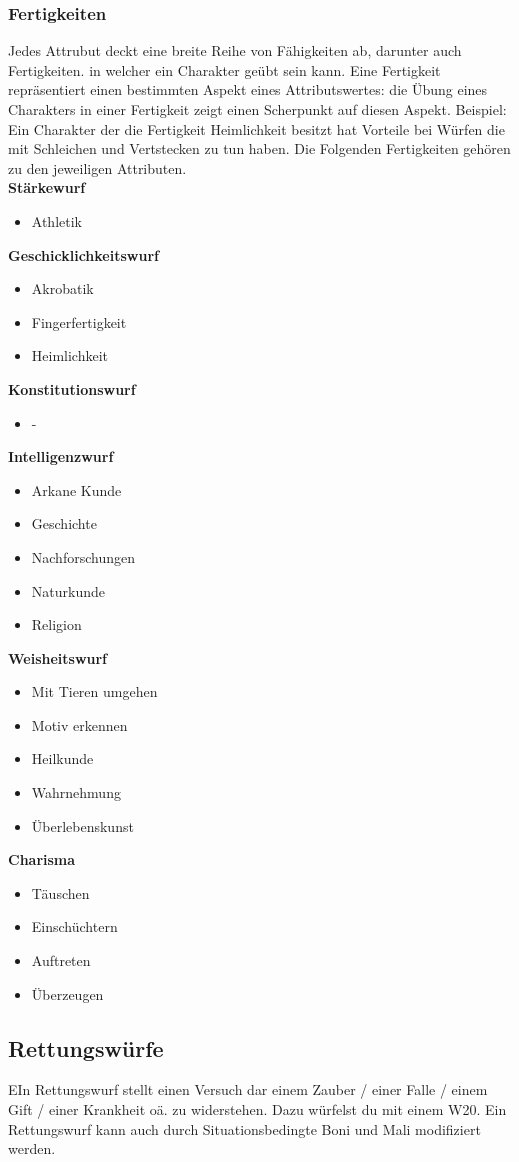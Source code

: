 \subsubsection{Fertigkeiten}
Jedes Attrubut deckt eine breite Reihe von Fähigkeiten ab, darunter auch Fertigkeiten. in welcher ein Charakter geübt sein kann. Eine Fertigkeit repräsentiert einen bestimmten Aspekt eines Attributswertes: die Übung eines Charakters in einer Fertigkeit zeigt einen Scherpunkt auf diesen Aspekt.
Beispiel: Ein Charakter der die Fertigkeit Heimlichkeit besitzt hat Vorteile bei Würfen die mit Schleichen und Vertstecken zu tun haben. Die Folgenden Fertigkeiten gehören zu den jeweiligen Attributen.\\

\noindent \textbf{Stärkewurf}\\
\begin{itemize}
  \item Athletik
\end{itemize}
\noindent \textbf{Geschicklichkeitswurf}\\
\begin{itemize}
  \item Akrobatik
  \item Fingerfertigkeit
  \item Heimlichkeit
\end{itemize}
\noindent \textbf{Konstitutionswurf}\\
\begin{itemize}
  \item -
\end{itemize}
\noindent \textbf{Intelligenzwurf}\\
\begin{itemize}
  \item Arkane Kunde
  \item Geschichte
  \item Nachforschungen
  \item Naturkunde
  \item Religion
\end{itemize}
\noindent \textbf{Weisheitswurf}\\
\begin{itemize}
  \item Mit Tieren umgehen
  \item Motiv erkennen
  \item Heilkunde
  \item Wahrnehmung
  \item Überlebenskunst
\end{itemize}
\noindent \textbf{Charisma}\\
\begin{itemize}
  \item Täuschen
  \item Einschüchtern
  \item Auftreten
  \item Überzeugen
\end{itemize}

\subsection{Rettungswürfe}
EIn Rettungswurf stellt einen Versuch dar einem Zauber / einer Falle / einem Gift / einer Krankheit oä. zu widerstehen. Dazu würfelst du mit einem W20. Ein Rettungswurf kann auch durch Situationsbedingte Boni und Mali modifiziert werden.
